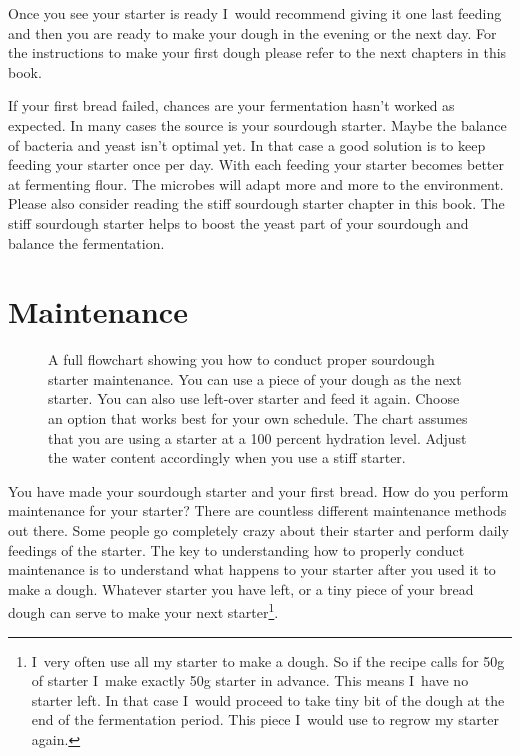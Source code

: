 Once you see your starter is ready I~would recommend giving it
one last feeding and then you are ready to make your dough in the
evening or the next day. For the instructions to make your
first dough please refer to the next chapters in this book.

If your first bread failed, chances are your fermentation hasn't
worked as expected. In many cases the source is your sourdough starter. Maybe
the balance of bacteria and yeast isn't optimal yet. In that case a good
solution is to keep feeding your starter once per day. With each feeding your
starter becomes better at fermenting flour. The microbes will adapt more and
more to the environment. Please also consider reading the stiff sourdough starter
chapter in this book. The stiff sourdough starter helps to boost the
yeast part of your sourdough and balance the fermentation.

\section{Maintenance}

\begin{figure}[!htb]
\begin{center}
  
  \caption{A full flowchart showing you how to conduct proper sourdough starter maintenance. You can use a
  piece of your dough as the next starter. You can also use left-over starter and feed it again. Choose an
  option that works best for your own schedule. The chart assumes that you are using a starter at a 100 percent
  hydration level. Adjust the water content accordingly when you use a stiff
starter.}%
  \label{fig:sourdough-maintenance-process}
\end{center}
\end{figure}

You have made your sourdough starter and your first bread. How do you perform
maintenance for your starter? There are countless different maintenance
methods out there. Some people go completely crazy about their starter and
perform daily feedings of the starter. The key to understanding how to properly
conduct maintenance is to understand what happens to your starter after you
used it to make a dough. Whatever starter you have left, or a tiny piece of
your bread dough can serve to make your next starter\footnote{I~very often use all my
starter to make a dough. So if the recipe calls for 50g of starter I~make
exactly 50g starter in advance. This means I~have no starter left. In that
case I~would proceed to take tiny bit of the dough at the end of the
fermentation period. This piece I~would use to regrow my starter again.}.

